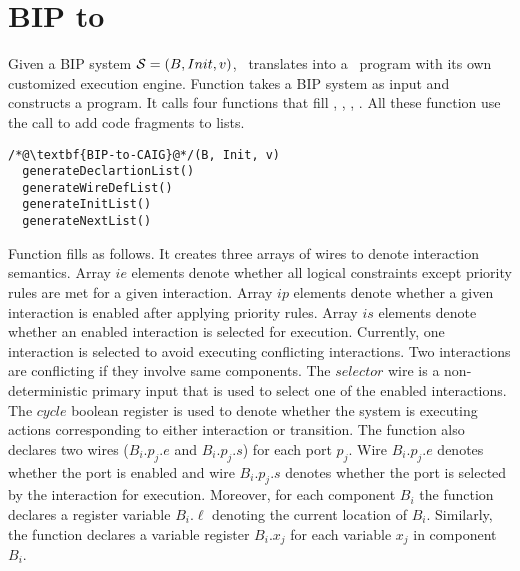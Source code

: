 
\section{BIP to \caig}
\label{sec:bip2aig}
Given a BIP system $\mathcal{S} = (B, Init, v)$, \biptool~translates \Pm into 
a \caig~program with its own customized execution engine. Function  takes a BIP system as input and constructs a \caig program. It calls four functions that fill , , , . All these function use the  call to add code fragments to lists. 

\begin{lstlisting}
/*@\textbf{BIP-to-CAIG}@*/(B, Init, v)
  generateDeclartionList()
  generateWireDefList()
  generateInitList()
  generateNextList()
\end{lstlisting}

Function  fills  as follows. 
It creates three arrays of wires to denote interaction semantics. Array $ie$ elements denote whether all logical constraints except priority rules are met for a given interaction. Array $ip$ elements denote whether a given interaction is enabled after applying priority rules. Array $is$ elements denote whether an enabled interaction is selected for execution. Currently, one interaction is selected to avoid executing conflicting interactions. Two interactions are conflicting if they involve same components. The $selector$ wire is a non-deterministic primary input that is used to select one of the enabled interactions. The $cycle$ boolean register is used to denote whether the system is executing actions corresponding to either interaction or transition. 
The function also declares two wires ($B_i.p_j.e$ and $B_i.p_j.s$) for each port $p_j$. Wire $B_i.p_j.e$ denotes whether the port is enabled and wire $B_i.p_j.s$ denotes whether the port is selected by the interaction for execution. Moreover, for each component $B_i$ the function declares a register variable $B_i.\ell$ denoting the current location of $B_i$. Similarly, the function declares a variable register $B_i.x_j$ for each variable $x_j$ in component $B_i$.  


